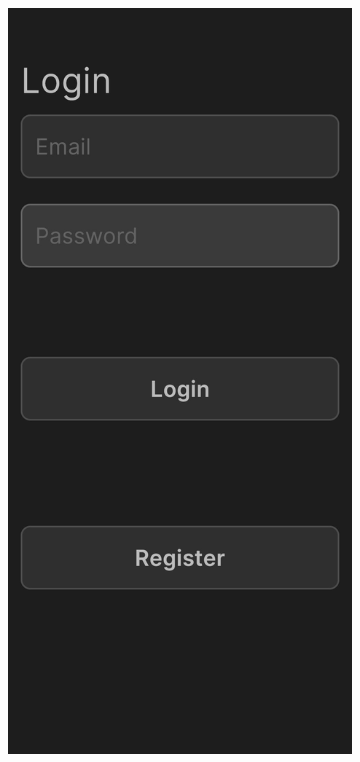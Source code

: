 \documentclass[12pt, titlepage]{article}
\begin{document}
\begin{figure}[ht!]
    \centering
    \begin{subfigure}[b]{0.48\textwidth}
        \centering
        \includegraphics[width=\textwidth]{login1.png}

\end{subfigure}
\end{figure}
\end{document}
